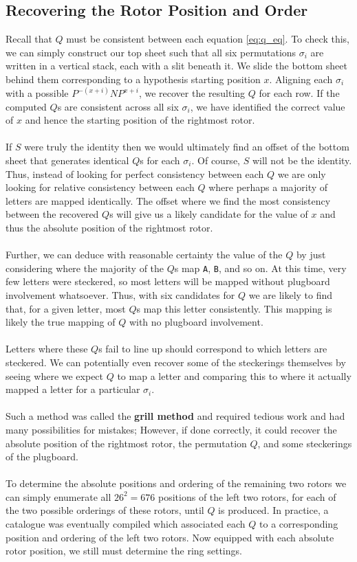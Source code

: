 \subsection{Recovering the Rotor Position and Order}
\noindent Recall that $Q$ must be consistent between
each equation \ref{eq:q_eq}. To check this, we can simply construct
our top sheet such that all six permutations $\sigma_i$ are written
in a vertical stack, each with a slit beneath it. We slide the bottom
sheet behind them corresponding to a hypothesis starting position
$x$. Aligning each $\sigma_i$ with a possible $P^{-(x+i)}NP^{x+i}$,
we recover the resulting $Q$ for each row. If the computed $Q$s are
consistent across all six $\sigma_i$, we have identified the correct
value of $x$ and hence the starting position of the rightmost rotor.
\\\\If $S$ were truly the identity then we would ultimately find an
offset of the bottom sheet that generates identical $Q$s for each
$\sigma_i$. Of course,
$S$ will not be the identity. Thus, instead of looking for perfect
consistency between each $Q$ we are only looking for relative
consistency between each $Q$ where perhaps a majority of letters are
mapped identically. The offset where we find the most consistency
between the recovered $Q$s will give us a likely candidate for the
value of $x$ and thus the absolute position of the rightmost rotor.
\\\\Further, we can
deduce with reasonable certainty the value of the $Q$ by just
considering where the majority of the $Q$s map \texttt{A},
\texttt{B}, and so on. At this time, very few letters were steckered,
so most letters will be mapped without plugboard involvement
whatsoever. Thus, with six candidates for $Q$ we are likely to find
that, for a given letter, most $Q$s map this letter consistently.
This mapping is likely the true mapping of $Q$ with no plugboard involvement.
\\\\Letters where these $Q$s fail to line up should correspond to
which letters are steckered. We can potentially even recover some of
the steckerings themselves by seeing where we expect $Q$ to map a
letter and comparing this to where it actually mapped a letter for a
particular $\sigma_i$.
\\\\Such a method was called the {\bf{grill
method}} and required tedious work and had many possibilities for
mistakes; However, if done correctly, it could recover the absolute
position of the rightmost rotor, the permutation $Q$, and some
steckerings of the plugboard.
\\\\To determine the absolute positions and ordering of the remaining two rotors
we can simply enumerate all $26^2 = 676$ positions of the left two
rotors, for each of the two possible orderings of these rotors, until $Q$ is
produced. In practice, a catalogue was eventually compiled which
associated each $Q$ to a corresponding position and ordering of the
left two rotors. Now equipped with each absolute rotor position, we
still must determine the ring settings.
